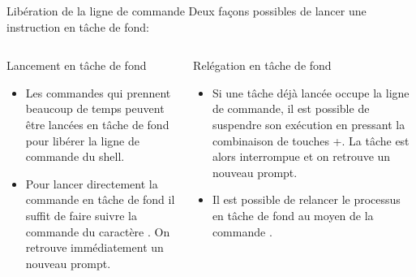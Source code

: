 \begin{frame}{Libération de la ligne de commande}
  Deux façons possibles de lancer une instruction en tâche de fond:
  \begin{columns}
    \begin{column}{6cm}
      \begin{block}{Lancement en tâche de fond}
        \begin{itemize}
        \item Les commandes qui prennent beaucoup de temps peuvent être
          lancées en tâche de fond pour libérer la ligne de commande du
          shell.
        \item Pour lancer directement la commande en tâche de fond il
          suffit de faire suivre la commande du caractère
          {\color{red}\lin{\&}}. On retrouve immédiatement un nouveau
          prompt.
        \end{itemize}
        \vspace{20pt}
        \begin{center}
          \scriptsize{  }
        \end{center}
      \end{block}
    \end{column}
    \begin{column}{6cm}
      \begin{block}{Relégation en tâche de fond}
        \begin{itemize}
        \item Si une tâche déjà lancée occupe la ligne de commande, il
          est possible de suspendre son exécution en pressant la
          combinaison de touches \Ctrl+. La tâche est alors
          interrompue et on retrouve un nouveau prompt.
        \item Il est possible de relancer le processus en tâche de fond
          au moyen de la commande .
        \end{itemize}
        \begin{center}
          \scriptsize{  }
        \end{center}
      \end{block}
    \end{column}
  \end{columns}
\end{frame}

